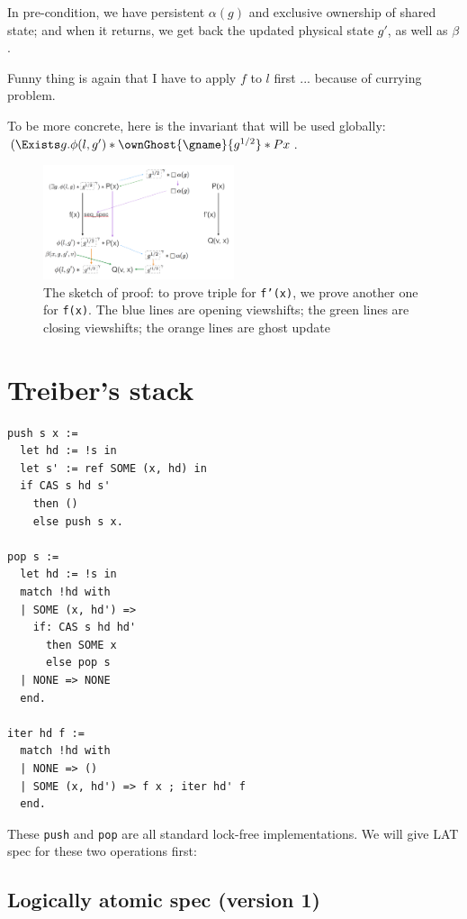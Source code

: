 \documentclass[11pt]{article}
\begin{document}
In pre-condition, we have persistent $\alpha(g)$ and exclusive ownership of shared state; and when it returns, we get back the updated physical state $g'$, as well as $\beta$.

Funny thing is again that I have to apply $f$ to $l$ first ... because of currying problem.

To be more concrete, here is the invariant that will be used globally: \( (\Exists g. \phi(l, g') * \ownGhost{\gname}{g^{1/2}} * P x \).

\begin{figure}[hb]
  \centering
  \includegraphics[width=0.5\textwidth]{atomic_sync}
  \caption{The sketch of proof: to prove triple for \texttt{f'(x)}, we prove another one for \texttt{f(x)}.
           The blue lines are opening viewshifts; the green lines are closing viewshifts; the orange lines are ghost update }
\end{figure}

\section{Treiber's stack}

\begin{verbatim}
push s x :=
  let hd := !s in
  let s' := ref SOME (x, hd) in
  if CAS s hd s'
    then ()
    else push s x.

pop s :=
  let hd := !s in
  match !hd with
  | SOME (x, hd') =>
    if: CAS s hd hd'
      then SOME x
      else pop s
  | NONE => NONE
  end.

iter hd f :=
  match !hd with
  | NONE => ()
  | SOME (x, hd') => f x ; iter hd' f
  end.

\end{verbatim}

These \texttt{push} and \texttt{pop} are all standard lock-free implementations. We will give LAT spec for these two operations first:

\subsection{Logically atomic spec (version 1)}
\end{document}
